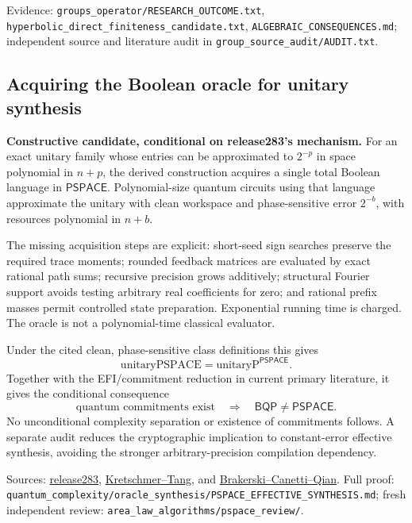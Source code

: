 \documentclass[11pt]{article}
\newcommand{\PSPACE}{\mathsf{PSPACE}}
\newcommand{\BQP}{\mathsf{BQP}}
\begin{document}
Evidence: \texttt{groups\_operator/RESEARCH\_OUTCOME.txt}, \texttt{hyperbolic\_direct\_finiteness\_candidate.txt}, \texttt{ALGEBRAIC\_CONSEQUENCES.md}; independent source and literature audit in \texttt{group\_source\_audit/AUDIT.txt}.

\subsection{Acquiring the Boolean oracle for unitary synthesis}
\textbf{Constructive candidate, conditional on release283's mechanism.} For an exact unitary family whose entries can be approximated to $2^{-p}$ in space polynomial in $n+p$, the derived construction acquires a single total Boolean language in $\PSPACE$. Polynomial-size quantum circuits using that language approximate the unitary with clean workspace and phase-sensitive error $2^{-b}$, with resources polynomial in $n+b$.

The missing acquisition steps are explicit: short-seed sign searches preserve the required trace moments; rounded feedback matrices are evaluated by exact rational path sums; recursive precision grows additively; structural Fourier support avoids testing arbitrary real coefficients for zero; and rational prefix masses permit controlled state preparation. Exponential running time is charged. The oracle is not a polynomial-time classical evaluator.

Under the cited clean, phase-sensitive class definitions this gives
\[
 \mathrm{unitaryPSPACE}=\mathrm{unitaryP}^{\PSPACE}.
\]
Together with the EFI/commitment reduction in current primary literature, it gives the conditional consequence
\[
 \text{quantum commitments exist}\quad\Longrightarrow\quad\BQP\ne\PSPACE.
\]
No unconditional complexity separation or existence of commitments follows. A separate audit reduces the cryptographic implication to constant-error effective synthesis, avoiding the stronger arbitrary-precision compilation dependency.

Sources: \href{https://github.com/openai/math/tree/adc7f1241b42e322a6451854ab7e4b4c146bf78a/preprints/Polynomial-Time-Unitary-Synthesis-from-a-Boolean-Oracle-October-5-2026/build}{release283}, \href{https://arxiv.org/abs/2610.03705}{Kretschmer--Tang}, and \href{https://drops.dagstuhl.de/doi/10.4230/LIPIcs.ITCS.2023.24}{Brakerski--Canetti--Qian}. Full proof: \texttt{quantum\_complexity/oracle\_synthesis/PSPACE\_EFFECTIVE\_SYNTHESIS.md}; fresh independent review: \texttt{area\_law\_algorithms/pspace\_review/}.
\end{document}
